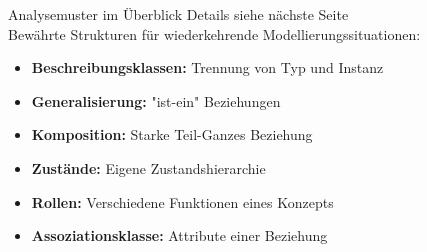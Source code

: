 \begin{concept}{Analysemuster im Überblick} Details siehe nächste Seite\\
Bewährte Strukturen für wiederkehrende Modellierungssituationen:
\begin{itemize}
    \item \textbf{Beschreibungsklassen:} Trennung von Typ und Instanz
    \item \textbf{Generalisierung:} "ist-ein" Beziehungen
    \item \textbf{Komposition:} Starke Teil-Ganzes Beziehung
    \item \textbf{Zustände:} Eigene Zustandshierarchie
    \item \textbf{Rollen:} Verschiedene Funktionen eines Konzepts
    \item \textbf{Assoziationsklasse:} Attribute einer Beziehung
\end{itemize}
\end{concept}


